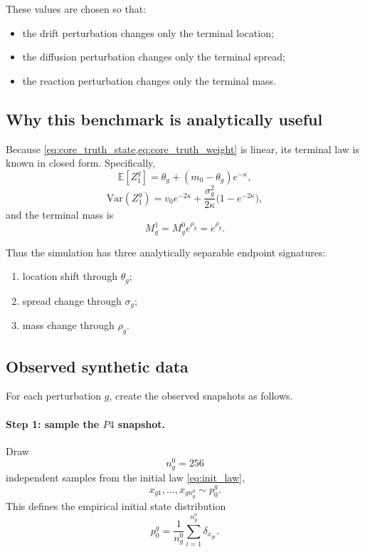 \documentclass[11pt]{article}
\newcommand{\E}{\mathbb{E}}
\newcommand{\Var}{\mathrm{Var}}
\begin{document}
These values are chosen so that:
\begin{itemize}[leftmargin=2em]
    \item the drift perturbation changes only the terminal location;
    \item the diffusion perturbation changes only the terminal spread;
    \item the reaction perturbation changes only the terminal mass.
\end{itemize}

\subsection{Why this benchmark is analytically useful}

Because \cref{eq:core_truth_state,eq:core_truth_weight} is linear, its terminal law is known in closed form. Specifically,
\begin{equation}
\E[Z_1^g]
=
\theta_g + (m_0-\theta_g)e^{-\kappa},
\label{eq:terminal_mean}
\end{equation}
\begin{equation}
\Var(Z_1^g)
=
v_0 e^{-2\kappa}
+
\frac{\sigma_g^2}{2\kappa}\big(1-e^{-2\kappa}\big),
\label{eq:terminal_var}
\end{equation}
and the terminal mass is
\begin{equation}
M_g^1
=
M_g^0 e^{\rho_g}
=
e^{\rho_g}.
\label{eq:terminal_mass_truth}
\end{equation}

Thus the simulation has three analytically separable endpoint signatures:
\begin{enumerate}[label=(\roman*),leftmargin=2.2em]
    \item location shift through \(\theta_g\);
    \item spread change through \(\sigma_g\);
    \item mass change through \(\rho_g\).
\end{enumerate}

\subsection{Observed synthetic data}

For each perturbation \(g\), create the observed snapshots as follows.

\paragraph{Step 1: sample the $P4$ snapshot.}
Draw
\[
n_g^0 = 256
\]
independent samples from the initial law \cref{eq:init_law},
\[
x_{g1},\dots,x_{g n_g^0}\sim p_0^g.
\]
This defines the empirical initial state distribution
\begin{equation}
p_0^g
=
\frac{1}{n_g^0}\sum_{i=1}^{n_g^0}\delta_{x_{gi}}.
\label{eq:empirical_p0_core}
\end{equation}
\end{document}
